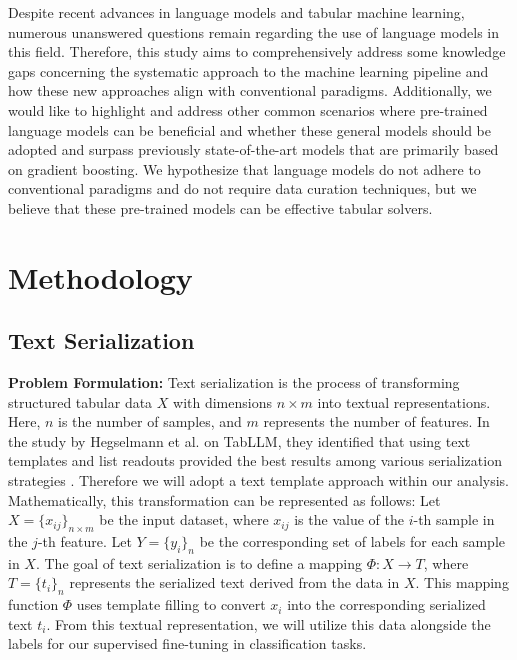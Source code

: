 \documentclass{article}
\theoremstyle{plain}
\theoremstyle{definition}
\theoremstyle{remark}
\begin{document}
Despite recent advances in language models and tabular machine learning, numerous unanswered questions remain regarding the use of language models in this field. Therefore, this study aims to comprehensively address some knowledge gaps concerning the systematic approach to the machine learning pipeline and how these new approaches align with conventional paradigms. Additionally, we would like to highlight and address other common scenarios where pre-trained language models can be beneficial and whether these general models should be adopted and surpass previously state-of-the-art models that are primarily based on gradient boosting. We hypothesize that language models do not adhere to conventional paradigms and do not require data curation techniques, but we believe that these pre-trained models can be effective tabular solvers.



\section{Methodology}

\subsection{Text Serialization}
\textbf{Problem Formulation:} Text serialization is the process of transforming structured tabular data \( X \) with dimensions \( n \times m \) into textual representations. Here, \( n \) is the number of samples, and \( m \) represents the number of features. In the study by Hegselmann et al. on TabLLM, they identified that using text templates and list readouts provided the best results among various serialization strategies \cite{hegselmann2023tabllm}. Therefore we will adopt a text template approach within our analysis. Mathematically, this transformation can be represented as follows: Let \( X = \{x_{ij}\}_{n \times m} \) be the input dataset, where \( x_{ij} \) is the value of the \( i \)-th sample in the \( j \)-th feature. Let \( Y = \{y_i\}_n \) be the corresponding set of labels for each sample in \( X \). The goal of text serialization is to define a mapping \( \Phi: X \rightarrow T \), where \( T = \{t_i\}_n \) represents the serialized text derived from the data in \( X \). This mapping function \( \Phi \) uses  template filling to convert \( x_i \) into the corresponding serialized text \( t_i \). From this textual representation, we will utilize this data alongside the labels for our supervised fine-tuning in classification tasks.
\end{document}
